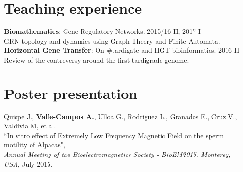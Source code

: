 \documentclass[margin,line]{res}
\begin{document}
\begin{resume}
\section{\sc Teaching experience}
{\bf Biomathematics}: Gene Regulatory Networks. \hfill {2015/16-II, 2017-I}\\ GRN topology and dynamics using Graph Theory and Finite Automata. \\[4pt] %
{\bf Horizontal Gene Transfer}: On \#tardigate and HGT bioinformatics. \hfill {2016-II}\\ 
Review of the controversy around the first tardigrade genome. \\


\section{\sc Poster presentation}

Quispe J., \textbf{Valle-Campos A.}, Ulloa G., Rodriguez L., Granados E., Cruz V., Valdivia M, et al.\\ ``In vitro effect of Extremely Low Frequency Magnetic Field on the sperm motility of Alpacas", \\ {\em Annual Meeting of the Bioelectromagnetics Society - BioEM2015. Monterey, USA}, July 2015.\\%





\end{resume}
\end{document}
